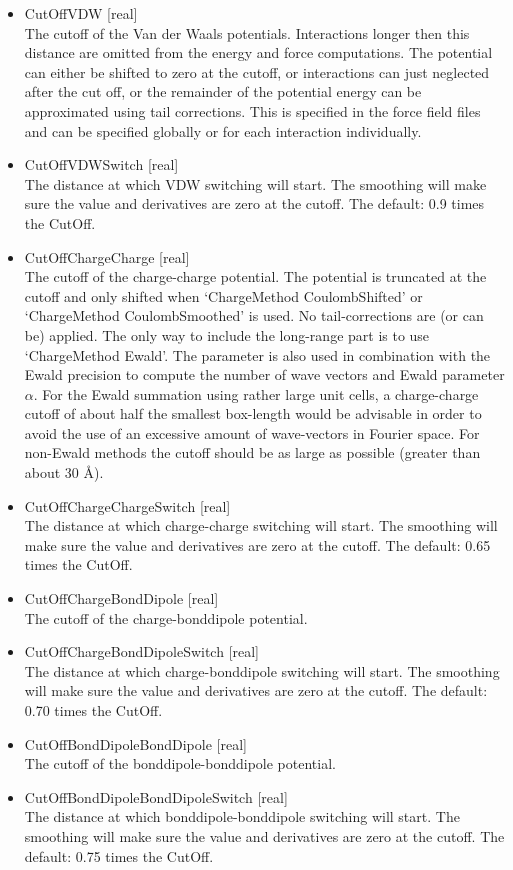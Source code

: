 \begin{itemize}
\item{CutOffVDW [real]}\\
The cutoff of the Van der Waals potentials. Interactions longer then this distance are omitted from the
energy and force computations. The potential can either be shifted to zero at the cutoff, or interactions
can just neglected after the cut off, or the remainder of the potential energy can be approximated using
tail corrections. This is specified in the force field files and can be specified globally or
for each interaction individually.
\item{CutOffVDWSwitch [real]}\\
The distance at which VDW switching will start. The smoothing will make sure the value and derivatives are zero at the cutoff.
The default: 0.9 times the CutOff.
\item{CutOffChargeCharge [real]}\\
The cutoff of the charge-charge potential. The potential is truncated at the cutoff and only shifted when `ChargeMethod CoulombShifted'
or `ChargeMethod CoulombSmoothed' is used.
No tail-corrections are (or can be) applied. The only way to include the long-range part is to use `ChargeMethod Ewald'.
The parameter is also used in combination with the
Ewald precision to compute the number of wave vectors and Ewald parameter $\alpha$.
For the Ewald summation using rather large unit cells, a charge-charge cutoff of about half the smallest box-length would be advisable
in order to avoid the use of an excessive amount of wave-vectors in Fourier space. For non-Ewald methods the cutoff should be as large
as possible (greater than about 30 \AA).
\item{CutOffChargeChargeSwitch [real]}\\
The distance at which charge-charge switching will start. The smoothing will make sure the value and derivatives are zero at the cutoff.
The default: 0.65 times the CutOff.
\item{CutOffChargeBondDipole [real]}\\
The cutoff of the charge-bonddipole potential.
\item{CutOffChargeBondDipoleSwitch [real]}\\
The distance at which charge-bonddipole switching will start. The smoothing will make sure the value and derivatives are zero at the cutoff.
The default: 0.70 times the CutOff.
\item{CutOffBondDipoleBondDipole [real]}\\
The cutoff of the bonddipole-bonddipole potential.
\item{CutOffBondDipoleBondDipoleSwitch [real]}\\
The distance at which bonddipole-bonddipole switching will start. The smoothing will make sure the value and derivatives are zero at the cutoff.
The default: 0.75 times the CutOff.



\end{itemize}

